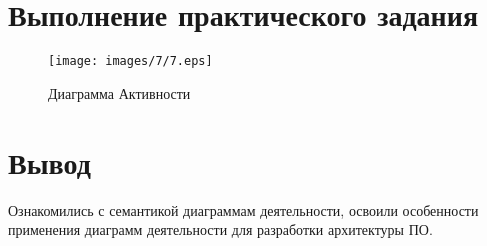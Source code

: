 \section{Выполнение практического задания}

\begin{figure}[h!]
        \centering
        \texttt{[image: images/7/7.eps]}
        \caption{Диаграмма Активности}
\end{figure}

\section{Вывод}

Ознакомились с семантикой диаграммам деятельности, освоили особенности применения диаграмм деятельности для разработки архитектуры ПО.
